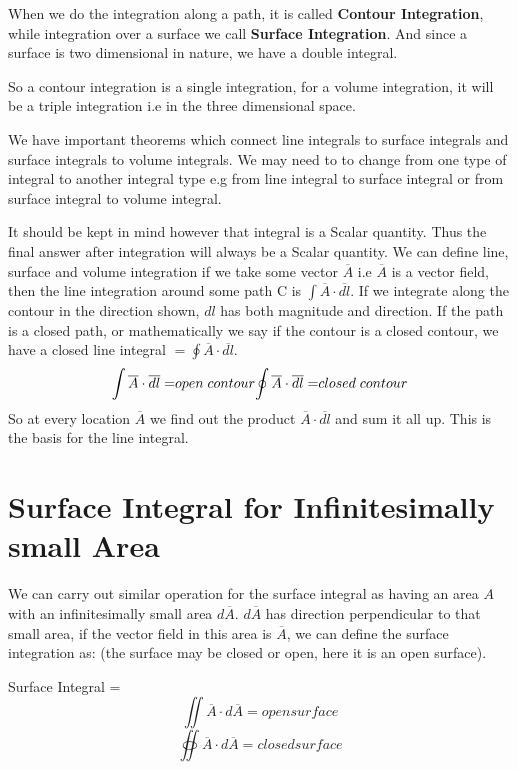 When we do the integration along a path, it is called \textbf{Contour Integration}, while integration over a surface we call \textbf{Surface Integration}. And since a surface is two dimensional in nature, we have a double integral.

So a contour integration is a single integration, for a volume integration, it will be a triple integration i.e in the three dimensional space.

We have important theorems which connect line integrals to surface integrals and surface integrals to volume integrals. We may need to to change from one type of integral to another integral type e.g from line integral to surface integral or from surface integral to volume integral.

It should be kept in mind however that integral is a Scalar quantity. Thus the final answer after integration will always be a Scalar quantity. We can define line, surface and volume integration if we take some vector $\overline{A}$ i.e $\overline{A}$ is a vector field, then the line integration around some path C is ${\displaystyle \int  \overline{A} \cdot \overline{dl}}$. If we integrate along the contour in the direction shown, $dl$ has both magnitude and direction. If the path is a closed path, or mathematically we say if the contour is a closed contour, we have a closed line integral $= {\displaystyle \oint  \overline{A} \cdot \overline{dl}}$.
\begin{equation}
{\displaystyle \int  \overline{A} \cdot \overline{dl} = }open\; contour \newline  {\displaystyle \oint  \overline{A} \cdot \overline{dl}= }closed\; contour
\end{equation}
So at every location $\overline{A}$ we find out the product $\overline{A} \cdot \overline{dl}$ and sum it all up. This is the basis for the line integral.
\section{Surface Integral for Infinitesimally small Area}
We can carry out similar operation for the surface integral as having an area $A$ with an infinitesimally small area $d\overline{A}$. $d\overline{A}$ has direction perpendicular to that small area, if the vector field in this area is $\overline{A}$, we can define the surface integration as:
(the surface may be closed or open, here it is an open surface).

Surface Integral =
\begin{equation*}
{   \iint \overline{A} \cdot d\overline{A}= open surface }
\end{equation*}
\begin{equation}
\oiint \overline{A} \cdot d\overline{A} = closed surface
\end{equation}

